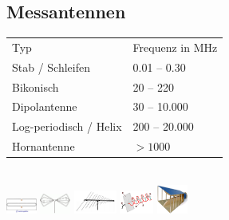 \documentclass[fs, footer]{latex4ei}
\begin{document}
\begin{multicols*}{4}
{	\subsection{Messantennen}
	\begin{tabular}{ll}
	Typ & Frequenz in $\si{\mega \hertz}$\\ \mrule
	Stab / Schleifen & 0.01 -- 0.30\\
	Bikonisch & 20 -- 220\\
	Dipolantenne & 30 -- 10.000\\
	Log-periodisch / Helix & 200 -- 20.000\\
	Hornantenne & $> 1000$\\
	\end{tabular}
	\quad {}
	\\
	\includegraphics[width = 1cm]{./img/dipol_antenna.png} \quad \includegraphics[width = 1cm]{./img/biconical_antenna.png} \quad \includegraphics[width = 1.4cm]{./img/log-periodic_antenna.jpg} \quad 
	\includegraphics[width = 1.1cm]{./img/helical_antenna.png} \quad \includegraphics[width = 1cm]{./img/horn_antenna.jpg}
	
}	




\sectionbox{
}
\end{multicols*}
\end{document}
